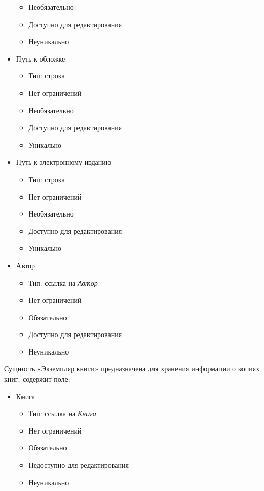 \documentclass[data-specification.tex]{subfiles}
\begin{document}
\begin{itemize}
\begin{itemize}
        \item Необязательно
        \item Доступно для редактирования
        \item Неуникально
    \end{itemize}
    \item Путь к обложке
    \begin{itemize}
        \item Тип: строка
        \item Нет ограничений
        \item Необязательно
        \item Доступно для редактирования
        \item Уникально
    \end{itemize}
    \item Путь к электронному изданию
    \begin{itemize}
        \item Тип: строка
        \item Нет ограничений
        \item Необязательно
        \item Доступно для редактирования
        \item Уникально
    \end{itemize}
    \item Автор
    \begin{itemize}
        \item Тип: ссылка на \textsl{Автор}
        \item Нет ограничений
        \item Обязательно
        \item Доступно для редактирования
        \item Неуникально
    \end{itemize}
\end{itemize}
\par
Сущность «Экземпляр книги» предназначена для хранения информации о копиях книг, содержит поле:
\begin{itemize}
    \item Книга
    \begin{itemize}
        \item Тип: ссылка на \textsl{Книга}
        \item Нет ограничений
        \item Обязательно
        \item Недоступно для редактирования
        \item Неуникально
    \end{itemize}
\end{itemize}
\end{document}
